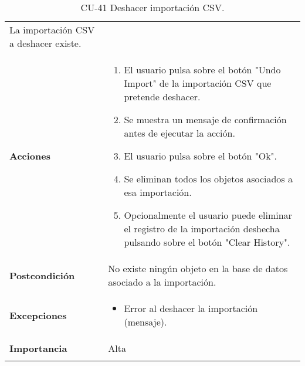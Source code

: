 \begin{longtable}[]{@{}ll@{}}
\begin{minipage}[t]{0.78\columnwidth}
La importación CSV a deshacer existe.\strut
\end{minipage}\tabularnewline
\begin{minipage}[t]{0.16\columnwidth}\raggedright
\textbf{Acciones}\strut
\end{minipage} & \begin{minipage}[t]{0.78\columnwidth}\raggedright
\begin{enumerate}
\def\labelenumi{\arabic{enumi}.}
\tightlist
\item
  El usuario pulsa sobre el botón "Undo Import" de la importación CSV
  que pretende deshacer.
\item
  Se muestra un mensaje de confirmación antes de ejecutar la acción.
\item
  El usuario pulsa sobre el botón "Ok".
\item
  Se eliminan todos los objetos asociados a esa importación.
\item
  Opcionalmente el usuario puede eliminar el registro de la importación
  deshecha pulsando sobre el botón "Clear History".
\end{enumerate}\strut
\end{minipage}\tabularnewline
\begin{minipage}[t]{0.16\columnwidth}\raggedright
\textbf{Postcondición}\strut
\end{minipage} & \begin{minipage}[t]{0.78\columnwidth}\raggedright
No existe ningún objeto en la base de datos asociado a la
importación.\strut
\end{minipage}\tabularnewline
\begin{minipage}[t]{0.16\columnwidth}\raggedright
\textbf{Excepciones}\strut
\end{minipage} & \begin{minipage}[t]{0.78\columnwidth}\raggedright
\begin{itemize}
\tightlist
\item
  Error al deshacer la importación (mensaje).
\end{itemize}\strut
\end{minipage}\tabularnewline
\begin{minipage}[t]{0.16\columnwidth}\raggedright
\textbf{Importancia}\strut
\end{minipage} & \begin{minipage}[t]{0.78\columnwidth}\raggedright
Alta\strut
\end{minipage}\tabularnewline
\bottomrule
\caption{CU-41 Deshacer importación CSV.}
\end{longtable}

